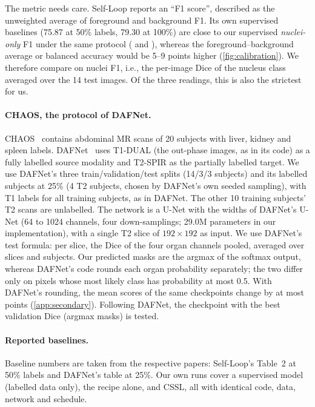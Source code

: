 \documentclass[11pt]{article}
\begin{document}
The metric needs care. Self-Loop reports an ``F1 score'', described as the unweighted average of foreground and background F1. Its own supervised baselines (75.87 at 50\% labels, 79.30 at 100\%) are close to our supervised \emph{nuclei-only} F1 under the same protocol (\nMsupFifty{} and \nMsupHundred{}), whereas the foreground--background average or balanced accuracy would be 5--9 points higher (\cref{fig:calibration}). We therefore compare on nuclei F1, i.e., the per-image Dice of the nucleus class averaged over the 14 test images. Of the three readings, this is also the strictest for us.

\paragraph{CHAOS, the protocol of DAFNet.} CHAOS~\citep{kavur2021chaos} contains abdominal MR scans of 20 subjects with liver, kidney and spleen labels. DAFNet~\citep{chartsias2021dafnet} uses T1-DUAL (the out-phase images, as in its code) as a fully labelled source modality and T2-SPIR as the partially labelled target. We use DAFNet's three train/validation/test splits (14/3/3 subjects) and its labelled subjects at 25\% (4 T2 subjects, chosen by DAFNet's own seeded sampling), with T1 labels for all training subjects, as in DAFNet. The other 10 training subjects' T2 scans are unlabelled. The network is a U-Net with the widths of DAFNet's U-Net (64 to 1024 channels, four down-samplings; 29.0M parameters in our implementation), with a single T2 slice of $192\times192$ as input. We use DAFNet's test formula: per slice, the Dice of the four organ channels pooled, averaged over slices and subjects. Our predicted masks are the argmax of the softmax output, whereas DAFNet's code rounds each organ probability separately; the two differ only on pixels whose most likely class has probability at most 0.5.\ifhaveround{} With DAFNet's rounding, the mean scores of the same checkpoints change by at most \nCroundMaxDiff{} points (\cref{app:secondary}).\fi{} Following DAFNet, the checkpoint with the best validation Dice (argmax masks) is tested.

\paragraph{Reported baselines.} Baseline numbers are taken from the respective papers: Self-Loop's Table~2 at 50\% labels and DAFNet's table at 25\%. Our own runs cover a supervised model (labelled data only), the recipe alone, and CSSL, all with identical code, data, network and schedule.
\end{document}
